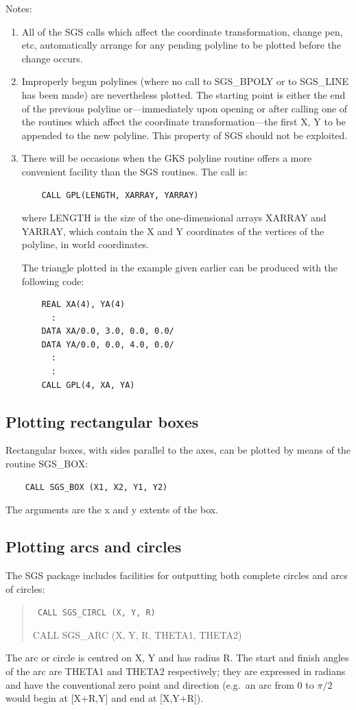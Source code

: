 \documentclass[11pt]{article}
\newcommand{\htmlref}[2]{#1}
\begin{document}
Notes:
\begin{enumerate}
\item All of the SGS calls which affect the coordinate transformation,
change pen, etc,
automatically arrange for any pending
polyline to be plotted before the change occurs.
\item Improperly begun polylines (where no call to SGS\_BPOLY or to SGS\_LINE
has been made) are nevertheless plotted.  The starting point
is either the end of the previous polyline or---immediately upon
opening or after calling one of the routines which affect the
coordinate transformation---the first X, Y to be appended to
the new polyline.  This property of SGS should not be exploited.
\item There will be occasions when the GKS polyline routine
offers a more convenient facility than the SGS
routines.  The call is:
\begin{verbatim}
    CALL GPL(LENGTH, XARRAY, YARRAY)
\end{verbatim}
where LENGTH is the size of the one-dimensional arrays XARRAY and
YARRAY, which contain the X and Y coordinates of the vertices
of the polyline, in world coordinates.  

The triangle plotted in the example given earlier can be produced
with the following code:
\begin{verbatim}
    REAL XA(4), YA(4)
      :
    DATA XA/0.0, 3.0, 0.0, 0.0/
    DATA YA/0.0, 0.0, 4.0, 0.0/
      :
      :
    CALL GPL(4, XA, YA)
\end{verbatim}
\end{enumerate}

\subsection {Plotting rectangular boxes}
Rectangular boxes, with sides parallel to the axes, can be plotted
by means of the routine \htmlref{SGS\_BOX}{SGS_BOX}:
\begin{verbatim}
    CALL SGS_BOX (X1, X2, Y1, Y2)
\end{verbatim}
The arguments are the x and y extents of the box.

\subsection {Plotting arcs and circles}
The SGS package includes facilities for outputting both complete
circles and arcs of circles:
\begin{quote}{\tt
    CALL \htmlref{SGS\_CIRCL}{SGS_CIRCL} (X, Y, R)

    CALL \htmlref{SGS\_ARC}{SGS_ARC} (X, Y, R, THETA1, THETA2)}
\end{quote}
The arc or circle is centred on X, Y and has radius R.  The start and
finish angles of the arc are THETA1 and THETA2 respectively;  they are
expressed in radians and have the conventional zero point and direction
(e.g.\ an arc from 0 to $\pi/2$ would begin at [X+R,Y] and end at [X,Y+R]).
\end{document}
